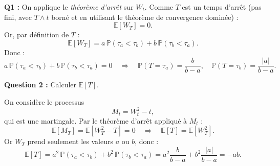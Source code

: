 \textbf{Q1 :}  
On applique le \textit{théorème d'arrêt} sur $W_t$. Comme $T$ est un temps d'arrêt (pas fini, avec $T \wedge t$ borné et en utilisant le théorème de convergence dominée) :
\[
\mathbb{E}[W_T] = 0.
\]  
Or, par définition de $T$ :
\[
\mathbb{E}[W_T] = a \, \mathbb{P}(\tau_a < \tau_b) + b \, \mathbb{P}(\tau_b < \tau_a).
\]  
Donc :
\[
a \, \mathbb{P}(\tau_a < \tau_b) + b \, \mathbb{P}(\tau_b < \tau_a) = 0
\quad \Rightarrow \quad
\mathbb{P}(T = \tau_a) = \frac{b}{b-a}, \quad 
\mathbb{P}(T = \tau_b) = \frac{|a|}{b-a}.
\]

\textbf{Question 2 :} Calculer $\mathbb{E}[T]$.  

On considère le processus
\[
M_t = W_t^2 - t,
\]  
qui est une martingale. Par le théorème d'arrêt appliqué à $M_t$ :
\[
\mathbb{E}[M_T] = \mathbb{E}[W_T^2 - T] = 0 \quad \Rightarrow \quad \mathbb{E}[T] = \mathbb{E}[W_T^2].
\]  
Or $W_T$ prend seulement les valeurs $a$ ou $b$, donc :
\[
\mathbb{E}[T] = a^2 \, \mathbb{P}(\tau_a < \tau_b) + b^2 \, \mathbb{P}(\tau_b < \tau_a) = a^2 \frac{b}{b-a} + b^2 \frac{|a|}{b-a} = -ab.
\]

